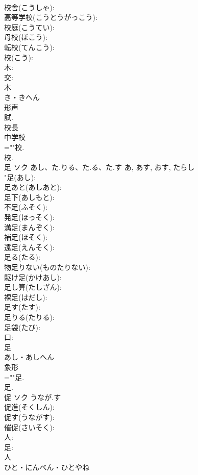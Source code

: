 \documentclass[8pt]{extreport}
\begin{document}
\begin{CJK}{UTF8}{min}
\\	校舎(こうしゃ): 
\\	高等学校(こうとうがっこう): 
\\	校庭(こうてい): 
\\	母校(ぼこう): 
\\	転校(てんこう): 
\\	校(こう): 
\\	木: 
\\	交: 
\\	木	
\\	き・きへん	
\\	形声 
\\	試.	
\\	校長 
\\	中学校 
\\	=""校.
\\	校.
\\	足	ソク	あし、た.りる、た.る、た.す	あ, あす, おす, たらし	
\\	"足(あし): 
\\	足あと(あしあと): 
\\	足下(あしもと): 
\\	不足(ふそく): 
\\	発足(ほっそく): 
\\	満足(まんぞく): 
\\	補足(ほそく): 
\\	遠足(えんそく): 
\\	足る(たる): 
\\	物足りない(ものたりない): 
\\	駆け足(かけあし): 
\\	足し算(たしざん): 
\\	裸足(はだし): 
\\	足す(たす): 
\\	足りる(たりる): 
\\	足袋(たび): 
\\	口: 
\\	足	
\\	あし・あしへん	
\\	象形 
\\	=""足.
\\	足.
\\	促	ソク	うなが.す		
\\	促進(そくしん): 
\\	促す(うながす): 
\\	催促(さいそく): 
\\	人: 
\\	足: 
\\	人	
\\	ひと・にんべん・ひとやね	

\end{CJK}
\end{document}

